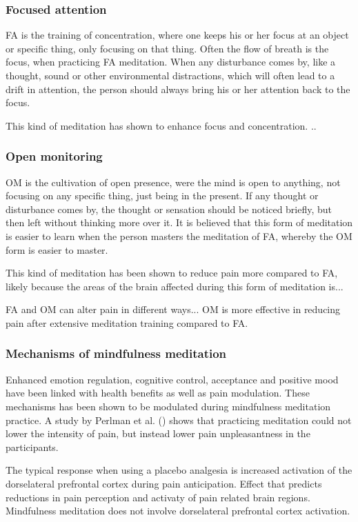 \subsubsection{Focused attention} 
FA is the training of concentration, where one keeps his or her focus at an object or specific thing, only focusing on that thing. Often the flow of breath is the focus, when practicing FA meditation.  When any disturbance comes by, like a thought, sound or other environmental distractions, which will often lead to a drift in attention, the person should always bring his or her attention back to the focus. \cite{Zeidan2016}

This kind of meditation has shown to enhance focus and concentration. ..

\subsubsection{Open monitoring}
OM is the cultivation of open presence, were the mind is open to anything, not focusing on any specific thing, just being in the present. If any thought or disturbance comes by, the thought or sensation should be noticed briefly, but then left without thinking more over it. It is believed that this form of meditation is easier to learn when the person masters the meditation of FA, whereby the OM form is easier to master. \cite{Zeidan2016}

This kind of meditation has been shown to reduce pain more compared to FA, likely because the areas of the brain affected during this form of meditation is...\cite{Perlman2010}

FA and OM can alter pain in different ways...
OM is more effective in reducing pain after extensive meditation training compared to FA. 
\cite{Varilly2012}

\subsubsection{Mechanisms of mindfulness meditation}
Enhanced emotion regulation, cognitive control, acceptance and positive mood have been linked with health benefits as well as pain modulation. These mechanisms has been shown to be modulated during mindfulness meditation practice.
A study by Perlman et al. (\cite{Perlman2010}) shows that practicing meditation could not lower the intensity of pain, but instead lower pain unpleasantness in the participants. \cite{Zeidan2012, Perlman2010}

The typical response when using a placebo analgesia is increased activation of the dorselateral prefrontal cortex during pain anticipation. Effect that predicts reductions in pain perception and activaty of pain related brain regions. Mindfulness meditation does not involve dorselateral prefrontal cortex activation. \cite{Zeidan2012}

